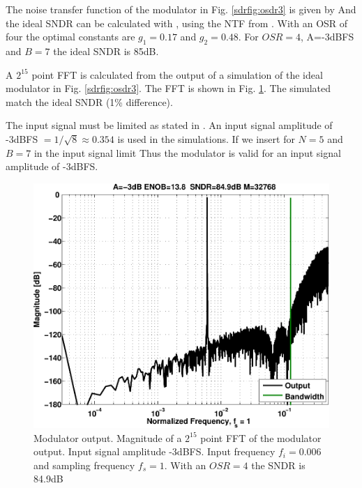 The noise transfer function of the modulator in Fig. \ref{sdrfig:osdr3} is given by
And the ideal SNDR can be calculated with , using the
NTF from . With an OSR of four the optimal constants  
are $g_1 = 0.17$ and $g_2 = 0.48$. For $OSR=4$, A=-3dBFS and $B=7$
the ideal SNDR is 85dB. 

A $2^{15}$ point FFT is calculated
from the output of a \matlab simulation of the ideal modulator in Fig. \ref{sdrfig:osdr3}. The FFT
is shown in Fig. \ref{sdrfig:osdr3_ideal}. The simulated match the ideal
SNDR (1\% difference).

The input signal
must be limited as stated in .
An input signal amplitude of
-3dBFS $= 1/\sqrt{8} \approx 0.354$ is used in the
simulations.  If we insert for $N=5$
and $B=7$ in the input signal limit 
Thus the modulator is valid for an input signal amplitude of
-3dBFS.


\begin{figure}[htbp]
\centerline{ \includegraphics[width=\myfigwidth]{graphics/osdr21}}
  \caption{Modulator output. Magnitude of a $2^{15}$ point FFT of the
    modulator output. Input signal amplitude -3dBFS. Input frequency
    $f_i = 0.006$ and sampling frequency $f_s = 1$. With an $OSR=4$
    the SNDR is 84.9dB }
  \label{sdrfig:osdr3_ideal}
\end{figure}

